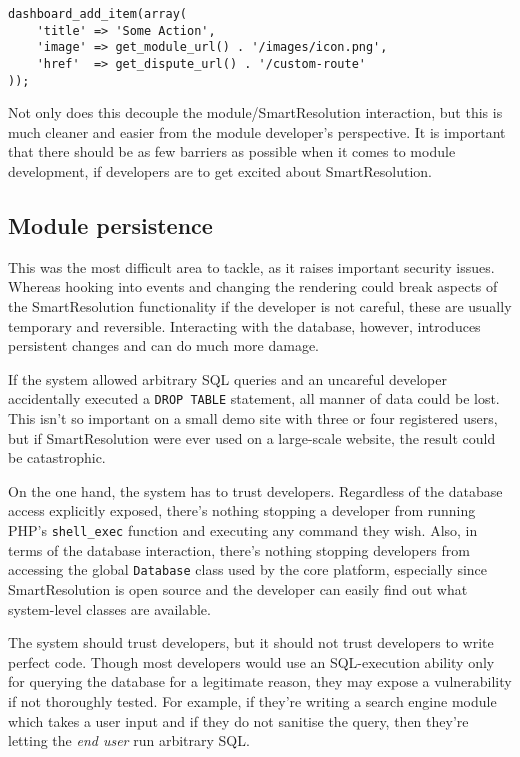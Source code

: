 \begin{lstlisting}
dashboard_add_item(array(
    'title' => 'Some Action',
    'image' => get_module_url() . '/images/icon.png',
    'href'  => get_dispute_url() . '/custom-route'
));
\end{lstlisting}

Not only does this decouple the module/SmartResolution interaction, but this is much cleaner and easier from the module developer's perspective. It is important that there should be as few barriers as possible when it comes to module development, if developers are to get excited about SmartResolution.

\subsection{Module persistence}

This was the most difficult area to tackle, as it raises important security issues. Whereas hooking into events and changing the rendering could break aspects of the SmartResolution functionality if the developer is not careful, these are usually temporary and reversible. Interacting with the database, however, introduces persistent changes and can do much more damage.

If the system allowed arbitrary SQL queries and an uncareful developer accidentally executed a \lstinline{DROP TABLE} statement, all manner of data could be lost. This isn't so important on a small demo site with three or four registered users, but if SmartResolution were ever used on a large-scale website, the result could be catastrophic.

On the one hand, the system has to trust developers. Regardless of the database access explicitly exposed, there's nothing stopping a developer from running PHP's \lstinline{shell_exec} function and executing any command they wish. Also, in terms of the database interaction, there's nothing stopping developers from accessing the global \lstinline{Database} class used by the core platform, especially since SmartResolution is open source and the developer can easily find out what system-level classes are available.

The system should trust developers, but it should not trust developers to write perfect code. Though most developers would use an SQL-execution ability only for querying the database for a legitimate reason, they may expose a vulnerability if not thoroughly tested. For example, if they're writing a search engine module which takes a user input and if they do not sanitise the query, then they're letting the \emph{end user} run arbitrary SQL.

